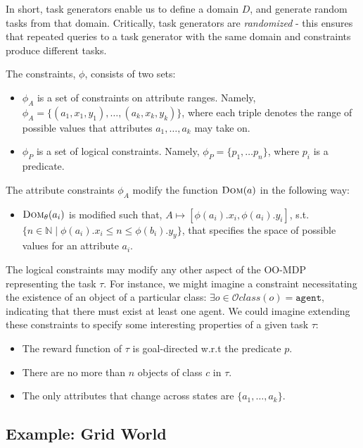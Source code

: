 \documentclass[11pt]{article}
\begin{document}
In short, task generators enable us to define a domain $D$, and generate random tasks from that domain. Critically, task generators are {\it randomized} - this ensures that repeated queries to a task generator with the same domain and constraints produce different tasks.

The constraints, $\phi$, consists of two sets:

\begin{itemize}
\item $\phi_{A}$ is a set of constraints on attribute ranges. Namely, $\phi_{A} = \{ (a_1, x_1, y_1), \ldots, (a_k, x_k, y_k) \}$, where each triple denotes the range of possible values that attributes $a_1, \ldots, a_k$ may take on.
\item $\phi_{P}$ is a set of logical constraints. Namely, $\phi_P = \{p_1, \ldots p_n\}$, where $p_i$ is a predicate.
\end{itemize}

The attribute constraints $\phi_A$ modify the function $\textsc{Dom}(a)$ in the following way:

\begin{itemize}
\item $\textsc{Dom}_\theta(a_i)$ is modified such that, $A \mapsto [\phi(a_i).x_i,\phi(a_i).y_i]$, s.t. $\{n \in \mathbb{N} \mid \phi(a_i).x_i \leq n \leq \phi(b_i).y_y \}$, that specifies the space of possible values for an attribute $a_i$.
\end{itemize}

The logical constraints may modify any other aspect of the OO-MDP representing the task $\tau$. For instance, we might imagine a constraint necessitating the existence of an object of a particular class: $\exists o \in \mathcal{O} class(o) = \texttt{agent}$, indicating that there must exist at least one agent. We could imagine extending these constraints to specify some interesting properties of a given task $\tau$:

\begin{itemize}
\item The reward function of $\tau$ is goal-directed w.r.t the predicate $p$.
\item There are no more than $n$ objects of class $c$ in $\tau$.
\item The only attributes that change across states are $\{a_1, \ldots, a_k\}$.
\end{itemize}

\subsection{Example: Grid World}
\end{document}
